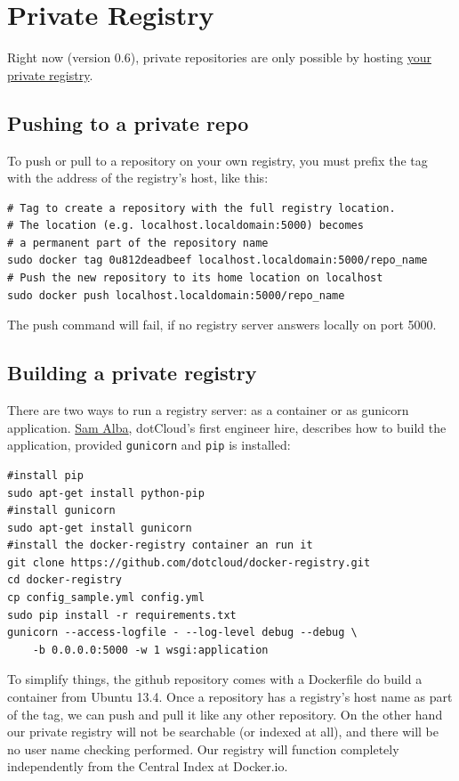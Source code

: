 \documentclass[11pt]{article}
\begin{document}
\section{Private Registry}
\label{sec-3}

Right now (version 0.6), private repositories are only possible by hosting \href{https://github.com/dotcloud/docker-registry}{your private registry}. 
\subsection{Pushing to a private repo}
\label{sec-3-1}

To push or pull to a repository on your own registry, you must prefix the tag with the address of the registry’s host, like this:

\begin{verbatim}
# Tag to create a repository with the full registry location.
# The location (e.g. localhost.localdomain:5000) becomes
# a permanent part of the repository name
sudo docker tag 0u812deadbeef localhost.localdomain:5000/repo_name
# Push the new repository to its home location on localhost
sudo docker push localhost.localdomain:5000/repo_name
\end{verbatim}
The push command will fail, if no registry server answers locally on port 5000.
\subsection{Building a private registry}
\label{sec-3-2}

There are two ways to run a registry server: as a container or as gunicorn application. \href{http://blog.docker.io/2013/07/how-to-use-your-own-registry/}{Sam Alba}, dotCloud's first engineer hire, describes how to build the application, provided \texttt{gunicorn} and \texttt{pip} is installed:

\begin{verbatim}
#install pip 
sudo apt-get install python-pip
#install gunicorn
sudo apt-get install gunicorn
#install the docker-registry container an run it
git clone https://github.com/dotcloud/docker-registry.git
cd docker-registry
cp config_sample.yml config.yml
sudo pip install -r requirements.txt
gunicorn --access-logfile - --log-level debug --debug \
    -b 0.0.0.0:5000 -w 1 wsgi:application
\end{verbatim}

To simplify things, the github repository comes with a Dockerfile do build a container from Ubuntu 13.4.
Once a repository has a registry’s host name as part of the tag, we can push and pull it like any other repository. On the other hand our private registry will not be searchable (or indexed at all), and there will be no user name checking performed. Our registry will function completely independently from the Central Index at Docker.io.
\end{document}
